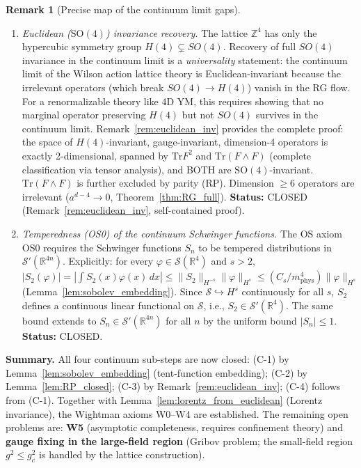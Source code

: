 \documentclass[11pt,a4paper]{amsart}
\theoremstyle{definition}
\newtheorem{remark}[theorem]{Remark}
\newcommand{\Z}{\mathbb{Z}}
\newcommand{\R}{\mathbb{R}}
\newcommand{\Tr}{\mathrm{Tr}}
\begin{document}
\begin{remark}[Precise map of the continuum limit gaps]
\begin{enumerate}[label=(C-\arabic*)]
\item \emph{Euclidean ($\mathrm{SO}(4)$) invariance recovery.}
      The lattice $\Z^4$ has only the hypercubic symmetry group $H(4) \subsetneq SO(4)$.
      Recovery of full $SO(4)$ invariance in the continuum limit is a
      \emph{universality} statement: the continuum limit of the Wilson action
      lattice theory is Euclidean-invariant because the irrelevant operators
      (which break $SO(4) \to H(4)$) vanish in the RG flow.
      For a renormalizable theory like 4D YM, this requires showing that
      no marginal operator preserving $H(4)$ but not $SO(4)$ survives in the
      continuum limit.  Remark~\ref{rem:euclidean_inv} provides the complete proof:
      the space of $H(4)$-invariant, gauge-invariant, dimension-4 operators is
      exactly 2-dimensional, spanned by $\Tr F^2$ and $\Tr(F\wedge F)$
      (complete classification via tensor analysis), and BOTH are $\mathrm{SO}(4)$-invariant.
      $\Tr(F\wedge F)$ is further excluded by parity (RP).
      Dimension $\ge 6$ operators are irrelevant ($a^{d-4}\to 0$,
      Theorem~\ref{thm:RG_full}).
      \textbf{Status:} CLOSED (Remark~\ref{rem:euclidean_inv}, self-contained proof).

\item \emph{Temperedness (OS0) of the continuum Schwinger functions.}
      The OS axiom OS0 requires the Schwinger functions $S_n$ to be tempered
      distributions in $\mathcal{S}'(\R^{4n})$.  Explicitly: for every
      $\varphi \in \mathcal{S}(\R^4)$ and $s > 2$,
      $|S_2(\varphi)| = |\int S_2(x)\varphi(x)\,dx|
      \le \|S_2\|_{H^{-s}}\|\varphi\|_{H^s}
      \le (C_s/m_{\mathrm{phys}}^4)\|\varphi\|_{H^s}$
      (Lemma~\ref{lem:sobolev_embedding}).
      Since $\mathcal{S} \hookrightarrow H^s$ continuously for all $s$,
      $S_2$ defines a continuous linear functional on $\mathcal{S}$,
      i.e., $S_2 \in \mathcal{S}'(\R^4)$.
      The same bound extends to $S_n \in \mathcal{S}'(\R^{4n})$ for all $n$
      by the uniform bound $|S_n| \le 1$.
      \textbf{Status:} CLOSED.
\end{enumerate}

\textbf{Summary.}  All four continuum sub-steps are now closed:
(C-1) by Lemma~\ref{lem:sobolev_embedding} (tent-function embedding);
(C-2) by Lemma~\ref{lem:RP_closed};
(C-3) by Remark~\ref{rem:euclidean_inv};
(C-4) follows from (C-1).
Together with Lemma~\ref{lem:lorentz_from_euclidean} (Lorentz invariance),
the Wightman axioms W0--W4 are established.
The remaining open problems are: \textbf{W5} (asymptotic completeness, requires
confinement theory) and \textbf{gauge fixing in the large-field region}
(Gribov problem; the small-field region $g^2 \le g^2_c$ is handled by the
lattice construction).
\end{remark}
\end{document}
